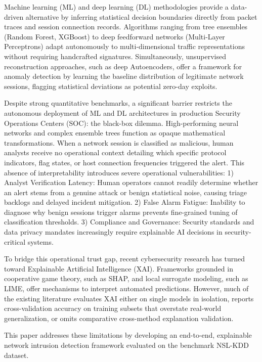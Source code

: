 \documentclass[10pt,twocolumn]{article}
\begin{document}
Machine learning (ML) and deep learning (DL) methodologies provide a data-driven alternative by inferring statistical decision boundaries directly from packet traces and session connection records. Algorithms ranging from tree ensembles (Random Forest, XGBoost) to deep feedforward networks (Multi-Layer Perceptrons) adapt autonomously to multi-dimensional traffic representations without requiring handcrafted signatures. Simultaneously, unsupervised reconstruction approaches, such as deep Autoencoders, offer a framework for anomaly detection by learning the baseline distribution of legitimate network sessions, flagging statistical deviations as potential zero-day exploits.

Despite strong quantitative benchmarks, a significant barrier restricts the autonomous deployment of ML and DL architectures in production Security Operations Centers (SOC): the black-box dilemma. High-performing neural networks and complex ensemble trees function as opaque mathematical transformations. When a network session is classified as malicious, human analysts receive no operational context detailing which specific protocol indicators, flag states, or host connection frequencies triggered the alert. This absence of interpretability introduces severe operational vulnerabilities: 1) Analyst Verification Latency: Human operators cannot readily determine whether an alert stems from a genuine attack or benign statistical noise, causing triage backlogs and delayed incident mitigation. 2) False Alarm Fatigue: Inability to diagnose why benign sessions trigger alarms prevents fine-grained tuning of classification thresholds. 3) Compliance and Governance: Security standards and data privacy mandates increasingly require explainable AI decisions in security-critical systems.

To bridge this operational trust gap, recent cybersecurity research has turned toward Explainable Artificial Intelligence (XAI). Frameworks grounded in cooperative game theory, such as SHAP, and local surrogate modeling, such as LIME, offer mechanisms to interpret automated predictions. However, much of the existing literature evaluates XAI either on single models in isolation, reports cross-validation accuracy on training subsets that overstate real-world generalization, or omits comparative cross-method explanation validation.

This paper addresses these limitations by developing an end-to-end, explainable network intrusion detection framework evaluated on the benchmark NSL-KDD dataset.
\end{document}
